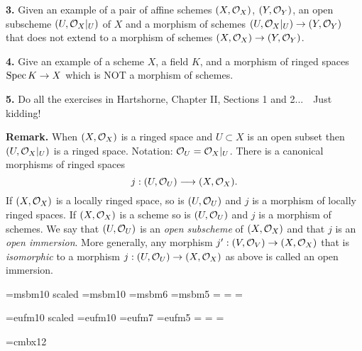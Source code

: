\medskip\item{\bf 3.} Given an example of a pair of affine schemes
$(X, {\cal O}_X)$, $(Y, {\cal O}_Y)$, an open subscheme $(U, {\cal O}_X|_U)$
of $X$ and a morphism of schemes $(U, {\cal O}_X|_U) \to (Y, {\cal O}_Y)$
that does not extend to a morphism of schemes $(X, {\cal O}_X) \to
(Y, {\cal O}_Y)$.

\medskip\item{\bf 4.} Give an example of a scheme $X$, a field $K$, and a
morphism of ringed spaces $\Spec K \to X$ which is NOT a morphism of schemes.

\medskip\item{\bf 5.} Do all the exercises in Hartshorne, Chapter II,
Sections 1 and 2...\ \ Just kidding!

\medskip\noindent
{\bf Remark.} When $(X, {\cal O}_X)$ is a ringed space and $U \subset X$
is an open subset then $(U, {\cal O}_X|_U)$ is a ringed space. Notation:
${\cal O}_U = {\cal O}_X|_U$. There is a canonical morphisms of ringed spaces
$$
	j : (U, {\cal O}_U) \longrightarrow (X, {\cal O}_X).
$$
If $(X, {\cal O}_X)$ is a locally ringed space, so is $(U, {\cal O}_U)$ and
$j$ is a morphism of locally ringed spaces. If $(X, {\cal O}_X)$ is a scheme
so is $(U, {\cal O}_U)$ and $j$ is a morphism of schemes. We say that
$(U, {\cal O}_U)$ is an {\it open subscheme} of $(X, {\cal O}_X)$ and that
$j$ is an {\it open immersion}. More generally, any morphism
$j' : (V, {\cal O}_V) \to (X, {\cal O}_X)$ that is {\it isomorphic} to a
morphism $j : (U, {\cal O}_U) \to (X, {\cal O}_X)$ as above is called an
open immersion.

\bye
\magnification{}
\nopagenumbers

\font\gbbb=msbm10 scaled 
\font\bbbf=msbm10 
\font\sbbb=msbm6 
\font\ssbbb=msbm5 
=\bbbf
{}=\sbbb 
{}=\ssbbb 
\def\bbb{\fam6}
\def\mP{{\bbb P}} 
\def\mA{{\bbb A}} 
\def\mB{{\bbb B}} 
\def\mR{{\bbb R}}
\def\mZ{{\bbb Z}}

\font\ggothic=eufm10 scaled 
\font\gothicf=eufm10
\font\sgothic=eufm7
\font\ssgothic=eufm5
=\gothicf
{}=\sgothic
{}=\ssgothic
\def\gothic{\fam5}


\font\Kopfont=cmbx12
\def\mapright#1{\smash{\mathop{\longrightarrow}\limits^{#1}}}
\def\mapdown#1{\Big\downarrow\rlap{$\vcenter{\hbox{$\scriptstyle#1$}}$}}
\def\downmap#1{\downarrow\rlap{$\vcenter{\hbox{$\scriptstyle#1$}}$}}
\def\mapup#1{\Big\uparrow\rlap{$\vcenter{\hbox{$\scriptstyle#1$}}$}}
\def\longlongrightarrow{\relbar \joinrel \longrightarrow}
\def\cC{{\cal C}}
\def\cD{{\cal D}}
\def\gp{{\gothic p}}
\def\gq{{\gothic q}}
\def\Spec{\mathop{\rm Spec}}
\def\Proj{\mathop{\rm Proj}}

